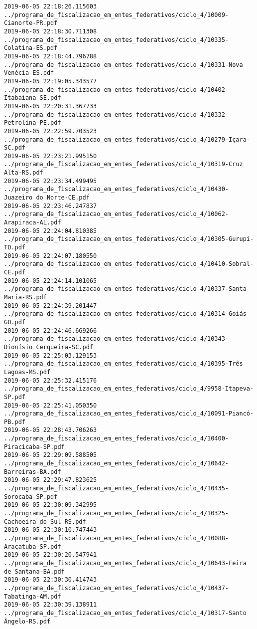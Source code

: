 \begin{lstlisting}
2019-06-05 22:18:26.115603 ../programa_de_fiscalizacao_em_entes_federativos/ciclo_4/10009-Cianorte-PR.pdf
2019-06-05 22:18:30.711308 ../programa_de_fiscalizacao_em_entes_federativos/ciclo_4/10335-Colatina-ES.pdf
2019-06-05 22:18:44.796788 ../programa_de_fiscalizacao_em_entes_federativos/ciclo_4/10331-Nova Venécia-ES.pdf
2019-06-05 22:19:05.343577 ../programa_de_fiscalizacao_em_entes_federativos/ciclo_4/10402-Itabaiana-SE.pdf
2019-06-05 22:20:31.367733 ../programa_de_fiscalizacao_em_entes_federativos/ciclo_4/10332-Petrolina-PE.pdf
2019-06-05 22:22:59.703523 ../programa_de_fiscalizacao_em_entes_federativos/ciclo_4/10279-Içara-SC.pdf
2019-06-05 22:23:21.995150 ../programa_de_fiscalizacao_em_entes_federativos/ciclo_4/10319-Cruz Alta-RS.pdf
2019-06-05 22:23:34.499495 ../programa_de_fiscalizacao_em_entes_federativos/ciclo_4/10430-Juazeiro do Norte-CE.pdf
2019-06-05 22:23:46.247837 ../programa_de_fiscalizacao_em_entes_federativos/ciclo_4/10062-Arapiraca-AL.pdf
2019-06-05 22:24:04.810385 ../programa_de_fiscalizacao_em_entes_federativos/ciclo_4/10305-Gurupi-TO.pdf
2019-06-05 22:24:07.180550 ../programa_de_fiscalizacao_em_entes_federativos/ciclo_4/10410-Sobral-CE.pdf
2019-06-05 22:24:14.101065 ../programa_de_fiscalizacao_em_entes_federativos/ciclo_4/10337-Santa Maria-RS.pdf
2019-06-05 22:24:39.201447 ../programa_de_fiscalizacao_em_entes_federativos/ciclo_4/10314-Goiás-GO.pdf
2019-06-05 22:24:46.669266 ../programa_de_fiscalizacao_em_entes_federativos/ciclo_4/10343-Dionísio Cerqueira-SC.pdf
2019-06-05 22:25:03.129153 ../programa_de_fiscalizacao_em_entes_federativos/ciclo_4/10395-Três Lagoas-MS.pdf
2019-06-05 22:25:32.415176 ../programa_de_fiscalizacao_em_entes_federativos/ciclo_4/9958-Itapeva-SP.pdf
2019-06-05 22:25:41.050350 ../programa_de_fiscalizacao_em_entes_federativos/ciclo_4/10091-Piancó-PB.pdf
2019-06-05 22:28:43.706263 ../programa_de_fiscalizacao_em_entes_federativos/ciclo_4/10400-Piracicaba-SP.pdf
2019-06-05 22:29:09.588505 ../programa_de_fiscalizacao_em_entes_federativos/ciclo_4/10642-Barreiras-BA.pdf
2019-06-05 22:29:47.823625 ../programa_de_fiscalizacao_em_entes_federativos/ciclo_4/10435-Sorocaba-SP.pdf
2019-06-05 22:30:09.342995 ../programa_de_fiscalizacao_em_entes_federativos/ciclo_4/10325-Cachoeira do Sul-RS.pdf
2019-06-05 22:30:10.747443 ../programa_de_fiscalizacao_em_entes_federativos/ciclo_4/10088-Araçatuba-SP.pdf
2019-06-05 22:30:20.547941 ../programa_de_fiscalizacao_em_entes_federativos/ciclo_4/10643-Feira de Santana-BA.pdf
2019-06-05 22:30:30.414743 ../programa_de_fiscalizacao_em_entes_federativos/ciclo_4/10437-Tabatinga-AM.pdf
2019-06-05 22:30:39.138911 ../programa_de_fiscalizacao_em_entes_federativos/ciclo_4/10317-Santo Ângelo-RS.pdf

\end{lstlisting}
